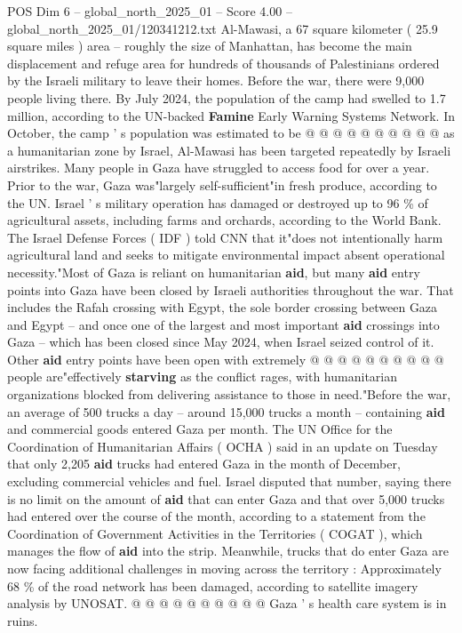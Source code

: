 \begin{textsample}{POS Dim 6 – global\_north\_2025\_01 – Score 4.00 – global\_north\_2025\_01/120341212.txt}
Al-Mawasi, a 67 square kilometer ( 25.9 square miles ) area -- roughly the size of Manhattan, has become the main displacement and refuge area for hundreds of thousands of Palestinians ordered by the Israeli military to leave their homes.
Before the war, there were 9,000 people living there.
By July 2024, the population of the camp had swelled to 1.7 million, according to the UN-backed \textbf{Famine} Early Warning Systems Network.
In October, the camp ' s population was estimated to be @ @ @ @ @ @ @ @ @ @ as a humanitarian zone by Israel, Al-Mawasi has been targeted repeatedly by Israeli airstrikes.
Many people in Gaza have struggled to access food for over a year.
Prior to the war, Gaza was"largely self-sufficient"in fresh produce, according to the UN.
Israel ' s military operation has damaged or destroyed up to 96 \% of agricultural assets, including farms and orchards, according to the World Bank.
The Israel Defense Forces ( IDF ) told CNN that it"does not intentionally harm agricultural land and seeks to mitigate environmental impact absent operational necessity."Most of Gaza is reliant on humanitarian \textbf{aid}, but many \textbf{aid} entry points into Gaza have been closed by Israeli authorities throughout the war.
That includes the Rafah crossing with Egypt, the sole border crossing between Gaza and Egypt -- and once one of the largest and most important \textbf{aid} crossings into Gaza -- which has been closed since May 2024, when Israel seized control of it.
Other \textbf{aid} entry points have been open with extremely @ @ @ @ @ @ @ @ @ @ people are"effectively \textbf{starving} as the conflict rages, with humanitarian organizations blocked from delivering assistance to those in need."Before the war, an average of 500 trucks a day -- around 15,000 trucks a month -- containing \textbf{aid} and commercial goods entered Gaza per month.
The UN Office for the Coordination of Humanitarian Affairs ( OCHA ) said in an update on Tuesday that only 2,205 \textbf{aid} trucks had entered Gaza in the month of December, excluding commercial vehicles and fuel.
Israel disputed that number, saying there is no limit on the amount of \textbf{aid} that can enter Gaza and that over 5,000 trucks had entered over the course of the month, according to a statement from the Coordination of Government Activities in the Territories ( COGAT ), which manages the flow of \textbf{aid} into the strip.
Meanwhile, trucks that do enter Gaza are now facing additional challenges in moving across the territory : Approximately 68 \% of the road network has been damaged, according to satellite imagery analysis by UNOSAT. @ @ @ @ @ @ @ @ @ @ Gaza ' s health care system is in ruins.

\end{textsample}
